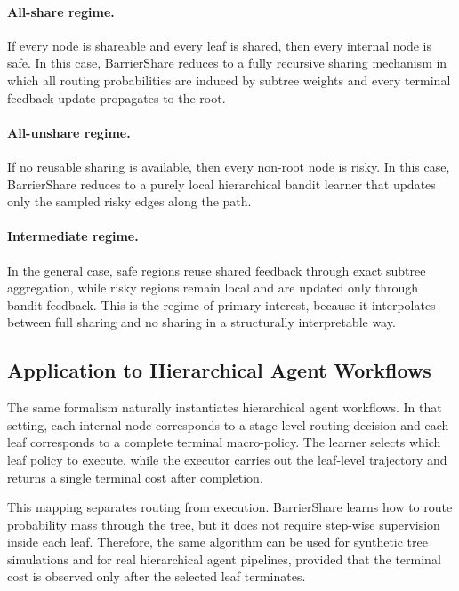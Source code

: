 \paragraph{All-share regime.}
If every node is shareable and every leaf is shared, then every internal node is safe. In this case, BarrierShare reduces to a fully recursive sharing mechanism in which all routing probabilities are induced by subtree weights and every terminal feedback update propagates to the root.

\paragraph{All-unshare regime.}
If no reusable sharing is available, then every non-root node is risky. In this case, BarrierShare reduces to a purely local hierarchical bandit learner that updates only the sampled risky edges along the path.

\paragraph{Intermediate regime.}
In the general case, safe regions reuse shared feedback through exact subtree aggregation, while risky regions remain local and are updated only through bandit feedback. This is the regime of primary interest, because it interpolates between full sharing and no sharing in a structurally interpretable way.

\subsection{Application to Hierarchical Agent Workflows}
\label{sec:barriershare_agent_instantiation}

The same formalism naturally instantiates hierarchical agent workflows. In that setting, each internal node corresponds to a stage-level routing decision and each leaf corresponds to a complete terminal macro-policy. The learner selects which leaf policy to execute, while the executor carries out the leaf-level trajectory and returns a single terminal cost after completion.

This mapping separates routing from execution. BarrierShare learns how to route probability mass through the tree, but it does not require step-wise supervision inside each leaf. Therefore, the same algorithm can be used for synthetic tree simulations and for real hierarchical agent pipelines, provided that the terminal cost is observed only after the selected leaf terminates.